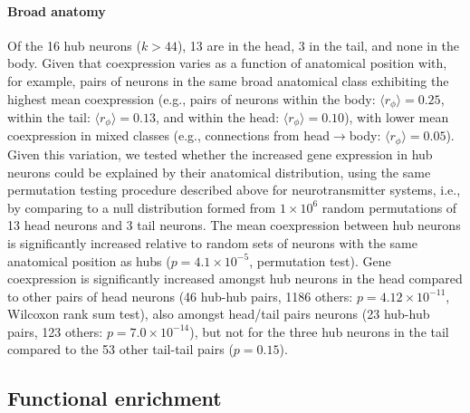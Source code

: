 \documentclass[10pt,letterpaper]{article}
\begin{document}
\paragraph{Broad anatomy}
Of the 16 hub neurons ($k > 44$), 13 are in the head, 3 in the tail, and none in the body.
Given that coexpression varies as a function of anatomical position with, for example, pairs of neurons in the same broad anatomical class exhibiting the highest mean coexpression (e.g., pairs of neurons within the body: $\langle r_\phi\rangle = 0.25$, within the tail: $\langle r_\phi\rangle = 0.13$, and within the head: $\langle r_\phi\rangle = 0.10$), with lower mean coexpression in mixed classes (e.g., connections from head$\rightarrow$body: $\langle r_\phi\rangle = 0.05$).
Given this variation, we tested whether the increased gene expression in hub neurons could be explained by their anatomical distribution, using the same permutation testing procedure described above for neurotransmitter systems, i.e., by comparing to a null distribution formed from $1\times 10^6$ random permutations of 13 head neurons and 3 tail neurons.
The mean coexpression between hub neurons is significantly increased relative to random sets of neurons with the same anatomical position as hubs ($p = 4.1\times 10^{-5}$, permutation test).
Gene coexpression is significantly increased amongst hub neurons in the head compared to other pairs of head neurons (46 hub-hub pairs, 1186 others: $p = 4.12 \times 10^{-11}$, Wilcoxon rank sum test), also amongst head/tail pairs neurons (23 hub-hub pairs, 123 others: $p = 7.0 \times 10^{-14}$), but not for the three hub neurons in the tail compared to the 53 other tail-tail pairs ($p = 0.15$).

\subsection*{Functional enrichment}

\end{document}
